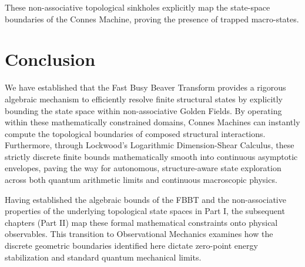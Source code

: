 \documentclass[12pt,oneside]{article}
\theoremstyle{principia}
\theoremstyle{definition}
\theoremstyle{remark}
\begin{document}
These non-associative topological sinkholes explicitly map the state-space boundaries of the Connes Machine, proving the presence of trapped macro-states.

\section{Conclusion}

We have established that the Fast Busy Beaver Transform provides a rigorous algebraic mechanism to efficiently resolve finite structural states by explicitly bounding the state space within non-associative Golden Fields. By operating within these mathematically constrained domains, Connes Machines can instantly compute the topological boundaries of composed structural interactions. Furthermore, through Lockwood's Logarithmic Dimension-Shear Calculus, these strictly discrete finite bounds mathematically smooth into continuous asymptotic envelopes, paving the way for autonomous, structure-aware state exploration across both quantum arithmetic limits and continuous macroscopic physics.

\vspace{1em}
\noindent Having established the algebraic bounds of the FBBT and the non-associative properties of the underlying topological state spaces in Part I, the subsequent chapters (Part II) map these formal mathematical constraints onto physical observables. This transition to Observational Mechanics examines how the discrete geometric boundaries identified here dictate zero-point energy stabilization and standard quantum mechanical limits.




\end{document}

